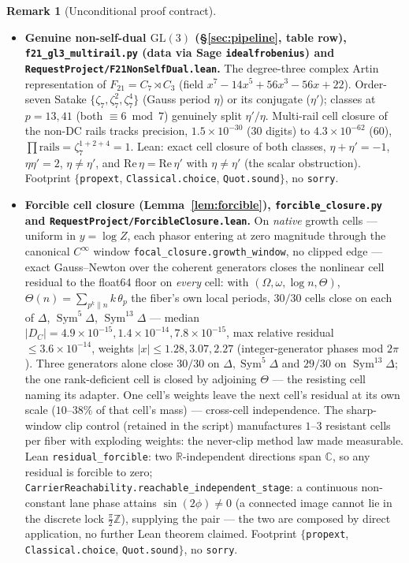 \documentclass[11pt]{article}
\theoremstyle{definition}
\newtheorem{remark}[theorem]{Remark}
\newcommand{\Sym}{\operatorname{Sym}}
\begin{document}
\begin{remark}[Unconditional proof contract]
\begin{enumerate}
\begin{itemize}
\item \textbf{Genuine non-self-dual $\mathrm{GL}(3)$ (\S\ref{sec:pipeline}, table row), \texttt{f21\_gl3\_multirail.py} (data via Sage \texttt{idealfrobenius}) and \texttt{RequestProject/F21NonSelfDual.lean}.} The degree-three complex Artin representation of $F_{21}=C_7\rtimes C_3$ (field $x^7-14x^5+56x^3-56x+22$). Order-seven Satake $\{\zeta_7,\zeta_7^2,\zeta_7^4\}$ (Gauss period $\eta$) or its conjugate ($\eta'$); classes at $p=13,41$ (both $\equiv6\bmod7$) genuinely split $\eta'/\eta$. Multi-rail cell closure of the non-DC rails tracks precision, $1.5\times10^{-30}$ (30 digits) to $4.3\times10^{-62}$ (60), $\prod\text{rails}=\zeta_7^{1+2+4}=1$. Lean: exact cell closure of both classes, $\eta+\eta'=-1$, $\eta\eta'=2$, $\eta\ne\eta'$, and $\mathrm{Re}\,\eta=\mathrm{Re}\,\eta'$ with $\eta\ne\eta'$ (the scalar obstruction). Footprint $\{$\texttt{propext}, \texttt{Classical.choice}, \texttt{Quot.sound}$\}$, no \texttt{sorry}.

\item \textbf{Forcible cell closure (Lemma~\ref{lem:forcible}), \texttt{forcible\_closure.py} and \texttt{RequestProject/ForcibleClosure.lean}.} On \emph{native} growth cells --- uniform in $y=\log Z$, each phasor entering at zero magnitude through the canonical $C^{\infty}$ window \texttt{focal\_closure.growth\_window}, no clipped edge --- exact Gauss--Newton over the coherent generators closes the nonlinear cell residual to the float64 floor on \emph{every} cell: with $(\Omega,\omega,\log n,\Theta)$, $\Theta(n)=\sum_{p^k\|n}k\,\theta_p$ the fiber's own local periods, $30/30$ cells close on each of $\Delta$, $\Sym^5\Delta$, $\Sym^{13}\Delta$ --- median $|D_C|=4.9\times10^{-15},1.4\times10^{-14},7.8\times10^{-15}$, max relative residual $\le3.6\times10^{-14}$, weights $|x|\le1.28,3.07,2.27$ (integer-generator phases mod $2\pi$). Three generators alone close $30/30$ on $\Delta,\Sym^5\Delta$ and $29/30$ on $\Sym^{13}\Delta$; the one rank-deficient cell is closed by adjoining $\Theta$ --- the resisting cell naming its adapter. One cell's weights leave the next cell's residual at its own scale ($10$--$38\%$ of that cell's mass) --- cross-cell independence. The sharp-window clip control (retained in the script) manufactures $1$--$3$ resistant cells per fiber with exploding weights: the never-clip method law made measurable. Lean \texttt{residual\_forcible}: two $\mathbb R$-independent directions span $\mathbb C$, so any residual is forcible to zero; \texttt{CarrierReachability.reachable\_independent\_stage}: a continuous non-constant lane phase attains $\sin(2\phi)\neq0$ (a connected image cannot lie in the discrete lock $\tfrac{\pi}{2}\mathbb Z$), supplying the pair --- the two are composed by direct application, no further Lean theorem claimed. Footprint $\{$\texttt{propext}, \texttt{Classical.choice}, \texttt{Quot.sound}$\}$, no \texttt{sorry}.


\end{itemize}
\end{enumerate}
\end{remark}
\end{document}
